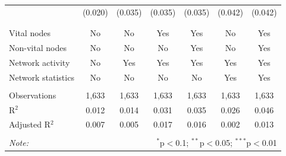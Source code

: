 \begin{table}[!htbp]
\begin{tabular}{@{\extracolsep{5pt}}lcccccc}
  & (0.020) & (0.035) & (0.035) & (0.035) & (0.042) & (0.042) \\ 
  & & & & & & \\ 
\hline \\[-1.8ex] 
Vital nodes & No & No & Yes & Yes & No & Yes \\ 
Non-vital nodes & No & No & No & Yes & No & Yes \\ 
Network activity & No & Yes & Yes & Yes & Yes & Yes \\ 
Network statistics & No & No & No & No & Yes & Yes \\ 
\hline &  &  &  &  &  &  \\ 
Observations & 1,633 & 1,633 & 1,633 & 1,633 & 1,633 & 1,633 \\ 
R$^{2}$ & 0.012 & 0.014 & 0.031 & 0.035 & 0.026 & 0.046 \\ 
Adjusted R$^{2}$ & 0.007 & 0.005 & 0.017 & 0.016 & 0.002 & 0.013 \\ 
\hline 
\hline \\[-1.8ex] 
\textit{Note:}  & \multicolumn{6}{r}{$^{*}$p$<$0.1; $^{**}$p$<$0.05; $^{***}$p$<$0.01} \\ 
\end{tabular} 
\end{table} 
